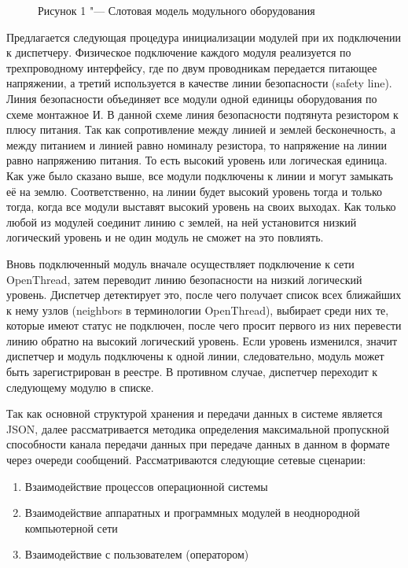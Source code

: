 \begin{figure}[ht]
	\caption*{Рисунок 1 "--- Слотовая модель модульного оборудования}\label{fig:main-arch}
\end{figure}

Предлагается следующая процедура инициализации модулей при их подключении к диспетчеру. Физическое подключение каждого модуля реализуется по трехпроводному интерфейсу, где по двум проводникам передается питающее напряжении, а третий используется в качестве линии безопасности (safety line). Линия безопасности объединяет все модули одной единицы оборудования по схеме монтажное И. В данной схеме линия безопасности подтянута резистором к плюсу питания. Так как сопротивление между линией и землей бесконечность, а между питанием и линией равно номиналу резистора, то напряжение на линии равно напряжению питания. То есть высокий уровень или логическая единица. Как уже было сказано выше, все модули подключены к линии и могут замыкать её на землю. Соответственно, на линии будет высокий уровень тогда и только тогда, когда все модули выставят высокий уровень на своих выходах. Как только любой из модулей соединит линию с землей, на ней установится низкий логический уровень и не один модуль не сможет на это повлиять.

Вновь подключенный модуль вначале осуществляет подключение к сети OpenThread, затем переводит линию безопасности на низкий логический уровень. Диспетчер детектирует это, после чего получает список всех ближайших к нему узлов (neighbors в терминологии OpenThread), выбирает среди них те, которые имеют статус не подключен, после чего просит первого из них перевести линию обратно на высокий логический уровень. Если уровень изменился, значит диспетчер и модуль подключены к одной линии, следовательно, модуль может быть зарегистрирован в реестре. В противном случае, диспетчер переходит к следующему модулю в списке.

Так как основной структурой хранения и передачи данных в системе является JSON, далее рассматривается методика определения максимальной пропускной способности канала передачи данных при передаче данных в данном в формате через очереди сообщений. Рассматриваются следующие сетевые сценарии:

\begin{enumerate}
	\item Взаимодействие процессов операционной системы
	\item Взаимодействие аппаратных и программных модулей в неоднородной компьютерной сети
	\item Взаимодействие с пользователем (оператором)	
\end{enumerate}

